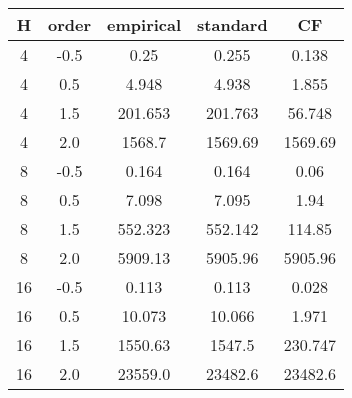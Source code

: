\begin{tabular}{ccccc}
  \toprule
  \textbf{H} & \textbf{order} & \textbf{empirical} & \textbf{standard} & \textbf{CF} \\\midrule
  4 & -0.5 & 0.25 & 0.255 & 0.138 \\
  4 & 0.5 & 4.948 & 4.938 & 1.855 \\
  4 & 1.5 & 201.653 & 201.763 & 56.748 \\
  4 & 2.0 & 1568.7 & 1569.69 & 1569.69 \\
  8 & -0.5 & 0.164 & 0.164 & 0.06 \\
  8 & 0.5 & 7.098 & 7.095 & 1.94 \\
  8 & 1.5 & 552.323 & 552.142 & 114.85 \\
  8 & 2.0 & 5909.13 & 5905.96 & 5905.96 \\
  16 & -0.5 & 0.113 & 0.113 & 0.028 \\
  16 & 0.5 & 10.073 & 10.066 & 1.971 \\
  16 & 1.5 & 1550.63 & 1547.5 & 230.747 \\
  16 & 2.0 & 23559.0 & 23482.6 & 23482.6 \\\bottomrule
\end{tabular}
